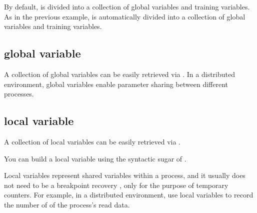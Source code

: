 \begin{content}

By default,  is divided into a collection of global variables and training variables. As in the previous example,  is automatically divided into a collection of global variables and training variables.

\subsection{global variable}

A collection of global variables can be easily retrieved via . In a distributed environment, global variables enable parameter sharing between different processes.


\subsection{local variable}

A collection of local variables can be easily retrieved via .


You can build a local variable using the syntactic sugar of .


Local variables represent shared variables within a process, and it usually does not need to be a breakpoint recovery , only for the purpose of temporary counters. For example, in a distributed environment, use local variables to record the number of  of the process's read data.


\end{content}
